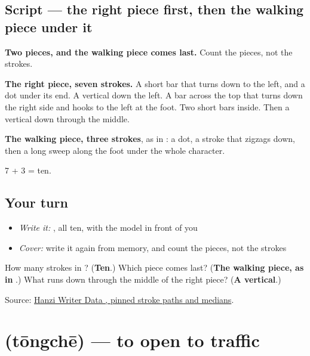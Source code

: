 \subsection*{Script — the right piece first, then the walking piece under it}

\begin{quote}
\end{quote}

\textbf{Two pieces, and the walking piece comes last.} Count the pieces, not the strokes.

\textbf{The right piece, seven strokes.} A short bar that turns down to the left, and a dot under its end. A vertical down the left. A bar across the top that turns down the right side and hooks to the left at the foot. Two short bars inside. Then a vertical down through the middle.

\textbf{The walking piece, three strokes}, as in : a dot, a stroke that zigzags down, then a long sweep along the foot under the whole character.

7 + 3 = ten.

\subsection*{Your turn}
\begin{itemize}
\raggedright
  \item \emph{Write it:} , all ten, with the model in front of you
  \item \emph{Cover:} write it again from memory, and count the pieces, not the strokes
\end{itemize}

\begin{tcolorbox}[breakable,colback=teal!4,colframe=teal!35!black,title={Before you move on}]
How many strokes in ? (\textbf{Ten}.) Which piece comes last? (\textbf{The walking piece, as in }.) What runs down through the middle of the right piece? (\textbf{A vertical}.)

Source: \href{https://raw.githubusercontent.com/chanind/hanzi-writer-data/68d10a4b21150cae5e1ebbd223eed289cf32d90c/data/\%E9\%80\%9A.json}{Hanzi Writer Data , pinned stroke paths and medians}.
\end{tcolorbox}
\section[\texorpdfstring{\zh{通车} (tōngchē)}{通车 (tōngchē)}]{ (tōngchē) — to open to traffic}

